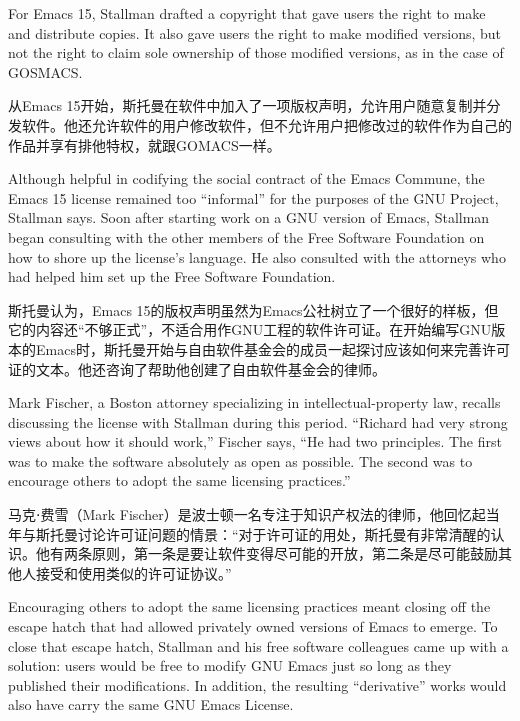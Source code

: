 \ifdefined\eng
For Emacs 15, Stallman drafted a copyright that gave users the right to make and distribute copies. It also gave users the right to make modified versions, but not the right to claim sole ownership of those modified versions, as in the case of GOSMACS.
\fi

\ifdefined\chs
从Emacs 15开始，斯托曼在软件中加入了一项版权声明，允许用户随意复制并分发软件。他还允许软件的用户修改软件，但不允许用户把修改过的软件作为自己的作品并享有排他特权，就跟GOMACS一样。
\fi

\ifdefined\eng
Although helpful in codifying the social contract of the Emacs Commune, the Emacs 15 license remained too ``informal'' for the purposes of the GNU Project, Stallman says. Soon after starting work on a GNU version of Emacs, Stallman began consulting with the other members of the Free Software Foundation on how to shore up the license's language. He also consulted with the attorneys who had helped him set up the Free Software Foundation.
\fi

\ifdefined\chs
斯托曼认为，Emacs 15的版权声明虽然为Emacs公社树立了一个很好的样板，但它的内容还``不够正式''，不适合用作GNU工程的软件许可证。在开始编写GNU版本的Emacs时，斯托曼开始与自由软件基金会的成员一起探讨应该如何来完善许可证的文本。他还咨询了帮助他创建了自由软件基金会的律师。
\fi

\ifdefined\eng
Mark Fischer, a Boston attorney specializing in intellectual-property law, recalls discussing the license with Stallman during this period. ``Richard had very strong views about how it should work,'' Fischer says, ``He had two principles. The first was to make the software absolutely as open as possible. The second was to encourage others to adopt the same licensing practices.''
\fi

\ifdefined\chs
马克⋅费雪（Mark Fischer）是波士顿一名专注于知识产权法的律师，他回忆起当年与斯托曼讨论许可证问题的情景：``对于许可证的用处，斯托曼有非常清醒的认识。他有两条原则，第一条是要让软件变得尽可能的开放，第二条是尽可能鼓励其他人接受和使用类似的许可证协议。''
\fi

\ifdefined\eng
Encouraging others to adopt the same licensing practices meant closing off the escape hatch that had allowed privately owned versions of Emacs to emerge. To close that escape hatch, Stallman and his free software colleagues came up with a solution: users would be free to modify GNU Emacs just so long as they published their modifications. In addition, the resulting ``derivative'' works would also have carry the same GNU Emacs License.
\fi

